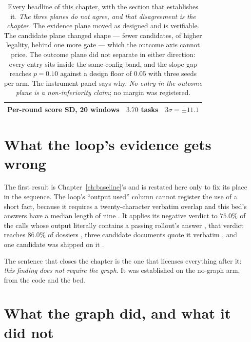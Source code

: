 \begin{table}[t]
\begin{tabular}{@{}lrrl@{}}
Per-round score SD, 20 windows         & \multicolumn{2}{c}{$3.70$ tasks}           & $3\sigma = \pm 11.1$ \F{15} \\
\bottomrule
\end{tabular}
\caption[Results at a glance]{Every headline of this chapter, with the
section that establishes it. \emph{The three planes do not agree, and that
disagreement is the chapter.} The evidence plane moved as designed and is
verifiable. The candidate plane changed shape --- fewer candidates, of
higher legality, behind one more gate --- which the outcome axis cannot
price. The outcome plane did not separate in either direction: every entry
sits inside the same-config band, and the slope gap reaches $p = 0.10$
against a design floor of $0.05$ with three seeds per arm. The instrument
panel says why. \emph{No entry in the outcome plane is a non-inferiority
claim}; no margin was registered.}
\label{tab:results}
\end{table}

\section{What the loop's evidence gets wrong}
\label{sec:evidence-wrong}

The first result is Chapter~\ref{ch:baseline}'s and is restated here only
to fix its place in the sequence. The loop's ``output used'' column cannot
register the use of a short fact, because it requires a twenty-character
verbatim overlap and this bed's answers have a median length of nine
. It applies its negative verdict to $75.0\%$ of the calls whose
output literally contains a passing rollout's answer , that verdict
reaches $86.0\%$ of dossiers , three candidate documents quote it
verbatim , and one candidate was shipped on it .

The sentence that closes the chapter is the one that licenses everything
after it: \emph{this finding does not require the graph}. It was
established on the no-graph arm, from the code and the bed.

\section{What the graph did, and what it did not}
\label{sec:what-graph-did}

